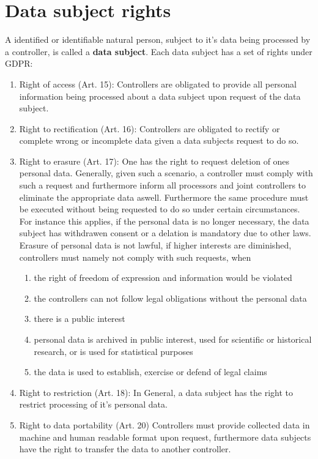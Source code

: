 \documentclass[a4paper,12pt]{report}
\begin{document}
	\section{Data subject rights}
	\startsection
	A identified or identifiable natural person, subject to it's data being processed by a controller, is called a \textbf{data subject}.
	Each data subject has a set of rights under GDPR:
	\begin{enumerate}[]
		\item Right of access (Art. 15):
		Controllers are obligated to provide all personal information being processed about a data subject upon request of the data subject.
		\item Right to rectification (Art. 16):
		Controllers are obligated to rectify or complete wrong or incomplete data given a data subjects request to do so.
		\item Right to erasure (Art. 17):
		One has the right to request deletion of ones personal data.
		Generally, given such a scenario, a controller must comply with such a request and furthermore inform all processors and joint controllers to eliminate the appropriate data aswell.
		Furthermore the same procedure must be executed without being requested to do so under certain circumstances.
		For instance this applies, if the personal data is no longer necessary, the data subject has withdrawen consent or a delation is mandatory due to other laws.
		Erasure of personal data is not lawful, if higher interests are diminished, controllers must namely not comply with such requests, when
		\begin{enumerate}
			\item the right of freedom of expression and information would be violated
			\item the controllers can not follow legal obligations without the personal data
			\item there is a public interest
			\item personal data is archived in public interest, used for scientific or historical research, or is used for statistical purposes
			\item the data is used to establish, exercise or defend of legal claims
		\end{enumerate}
		\item Right to restriction (Art. 18):
		In General, a data subject has the right to restrict processing of it's personal data.
		\item Right to data portability (Art. 20)
		Controllers must provide collected data in machine and human readable format upon request, furthermore data subjects have the right to transfer the data to another controller.

\end{enumerate}
\end{document}
